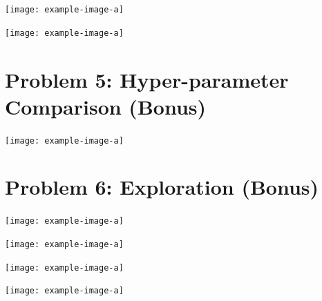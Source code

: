 \documentclass{article}
\begin{document}
\begin{answer}[title=Plot,height=9.5cm,width=\linewidth]
    \centering
    \texttt{[image: example-image-a]}
\end{answer}

\begin{answer}[title=Plot,height=9.5cm,width=\linewidth]
    \centering
    \texttt{[image: example-image-a]}
\end{answer}


\section{Problem 5: Hyper-parameter Comparison (Bonus)}
\begin{answer}[title=Plot,height=9.5cm,width=\linewidth]
    \centering
    \texttt{[image: example-image-a]}
\end{answer}


\section{Problem 6: Exploration (Bonus)}
\begin{answer}[title=Plot,height=9.5cm,width=\linewidth]
    \centering
    \texttt{[image: example-image-a]}
\end{answer}

\begin{answer}[title=Plot,height=9.5cm,width=\linewidth]
    \centering
    \texttt{[image: example-image-a]}
\end{answer}

\begin{answer}[title=Plot,height=9.5cm,width=\linewidth]
    \centering
    \texttt{[image: example-image-a]}
\end{answer}

\begin{answer}[title=Plot,height=9.5cm,width=\linewidth]
    \centering
    \texttt{[image: example-image-a]}
\end{answer}
\end{document}

